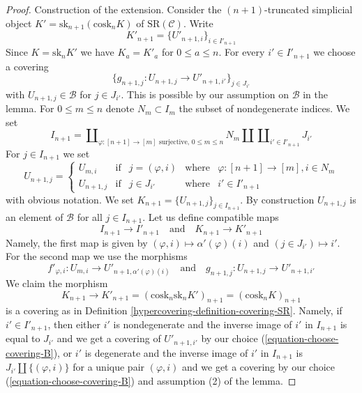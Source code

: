 \begin{proof}
\medskip\noindent
Construction of the extension. Consider the $(n + 1)$-truncated simplicial
object $K' = \text{sk}_{n + 1}(\text{cosk}_n K)$ of $\text{SR}(\mathcal{C})$.
Write
$$
K'_{n + 1} = \{U'_{n + 1, i}\}_{i \in I'_{n + 1}}
$$
Since $K = \text{sk}_n K'$ we have $K_a = K'_a$ for $0 \leq a \leq n$.
For every $i' \in I'_{n + 1}$ we choose a covering
\begin{equation}
\label{equation-choose-covering-B}
\{g_{n + 1, j} : U_{n + 1, j} \to U'_{n + 1, i'}\}_{j \in J_{i'}}
\end{equation}
with $U_{n + 1, j} \in \mathcal{B}$ for $j \in J_{i'}$.
This is possible by our assumption on $\mathcal{B}$ in the lemma.
For $0 \leq m \leq n$ denote $N_m \subset I_m$ the subset of
nondegenerate indices. We set
$$
I_{n + 1} =
\coprod\nolimits_{\varphi : [n + 1] \to [m]\text{ surjective, }0\leq m \leq n}
N_m \amalg
\coprod\nolimits_{i' \in I'_{n + 1}} J_{i'}
$$
For $j \in I_{n + 1}$ we set
$$
U_{n + 1, j} =
\left\{
\begin{matrix}
U_{m, i} & \text{if} &
j = (\varphi, i) & \text{where} & \varphi : [n + 1] \to [m], i \in N_m \\
U_{n + 1, j} & \text{if} &
j \in J_{i'} & \text{where} & i' \in I'_{n + 1}
\end{matrix}
\right.
$$
with obvious notation. We set $K_{n + 1} = \{U_{n + 1, j}\}_{j \in I_{n + 1}}$.
By construction $U_{n + 1, j}$ is an element
of $\mathcal{B}$ for all $j \in I_{n + 1}$. Let us define compatible
maps
$$
I_{n + 1} \to I'_{n + 1}
\quad\text{and}\quad
K_{n + 1} \to K'_{n + 1}
$$
Namely, the first map is given by
$(\varphi, i) \mapsto \alpha'(\varphi)(i)$ and
$(j \in J_{i'}) \mapsto i'$.
For the second map we use the morphisms
$$
f'_{\varphi, i} : U_{m, i} \to U'_{n + 1, \alpha'(\varphi)(i)}
\quad\text{and}\quad
g_{n + 1, j} : U_{n + 1, j} \to U'_{n + 1, i'}
$$
We claim the morphism
$$
K_{n + 1} \to K'_{n + 1} =
(\text{cosk}_n \text{sk}_n K')_{n + 1} =
(\text{cosk}_n K)_{n + 1}
$$
is a covering as in Definition \ref{hypercovering-definition-covering-SR}.
Namely, if $i' \in I'_{n + 1}$, then either $i'$ is nondegenerate
and the inverse image of $i'$ in $I_{n + 1}$ is equal to $J_{i'}$
and we get a covering of $U'_{n + 1, i'}$ by our choice
(\ref{equation-choose-covering-B}), or $i'$ is degenerate and
the inverse image of $i'$ in $I_{n + 1}$ is
$J_{i'} \amalg \{(\varphi, i)\}$ for a unique pair $(\varphi, i)$
and we get a covering by our choice (\ref{equation-choose-covering-B})
and assumption (2) of the lemma.


\end{proof}
